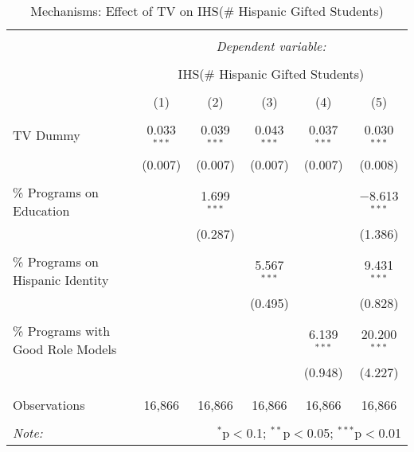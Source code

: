 
\begin{table}[!htbp] \centering 
  \caption{Mechanisms: Effect of TV on IHS(\# Hispanic Gifted Students)} 
  \label{} 
\begin{tabular}{@{\extracolsep{-2pt}}lccccc} 
\\[-1.8ex]\hline 
\hline \\[-1.8ex] 
 & \multicolumn{5}{c}{\textit{Dependent variable:}} \\ 
\cline{2-6} 
\\[-1.8ex] & \multicolumn{5}{c}{IHS(\# Hispanic Gifted Students)} \\ 
\\[-1.8ex] & (1) & (2) & (3) & (4) & (5)\\ 
\hline \\[-1.8ex] 
 TV Dummy & 0.033$^{***}$ & 0.039$^{***}$ & 0.043$^{***}$ & 0.037$^{***}$ & 0.030$^{***}$ \\ 
  & (0.007) & (0.007) & (0.007) & (0.007) & (0.008) \\ 
  & & & & & \\ 
 \% Programs on Education &  & 1.699$^{***}$ &  &  & $-$8.613$^{***}$ \\ 
  &  & (0.287) &  &  & (1.386) \\ 
  & & & & & \\ 
 \% Programs on Hispanic Identity &  &  & 5.567$^{***}$ &  & 9.431$^{***}$ \\ 
  &  &  & (0.495) &  & (0.828) \\ 
  & & & & & \\ 
 \% Programs with Good Role Models &  &  &  & 6.139$^{***}$ & 20.200$^{***}$ \\ 
  &  &  &  & (0.948) & (4.227) \\ 
  & & & & & \\ 
\hline \\[-1.8ex] 
Observations & 16,866 & 16,866 & 16,866 & 16,866 & 16,866 \\ 
\hline 
\hline \\[-1.8ex] 
\textit{Note:}  & \multicolumn{5}{r}{$^{*}$p$<$0.1; $^{**}$p$<$0.05; $^{***}$p$<$0.01} \\ 
\end{tabular} 
\end{table} 
